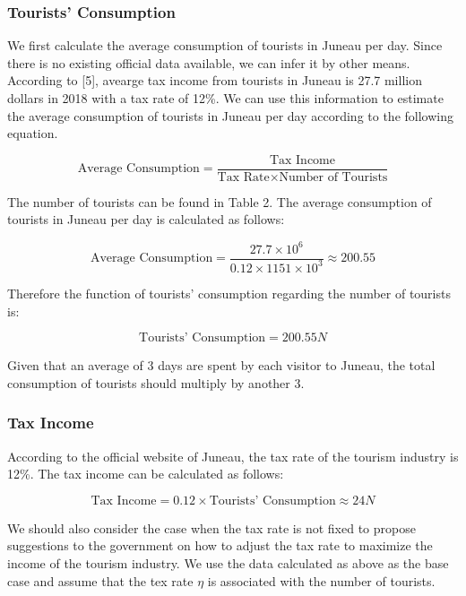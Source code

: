 \subsubsection{Tourists' Consumption}

We first calculate the average consumption of tourists in Juneau per day. Since there is no existing official data available, 
we can infer it by other means. According to [5], avearge tax income from tourists in Juneau is 27.7 million dollars in 2018
with a tax rate of 12\%. We can use this information to estimate the average consumption of tourists in Juneau per day according to 
the following equation.

\begin{equation}
    \text{Average Consumption} = \frac{\text{Tax Income}}{\text{Tax Rate} \times \text{Number of Tourists}}
\end{equation}

The number of tourists can be found in Table 2. The average consumption of 
tourists in Juneau per day is calculated as follows:

\begin{equation}
    \text{Average Consumption} = \frac{27.7 \times 10^6}{0.12 \times 1151 \times 10^3} \approx 200.55
\end{equation}

Therefore the function of tourists' consumption regarding the number of tourists is:


\begin{equation}
    \text{Tourists' Consumption} = 200.55 N
\end{equation}

Given that an average of 3 days are spent by each visitor to Juneau, 
the total consumption of tourists should multiply by another 3.

\subsubsection{Tax Income}

According to the official website of Juneau, the tax rate of the tourism industry is 12\%.
The tax income can be calculated as follows:

\begin{equation}
    \text{Tax Income} = 0.12 \times \text{Tourists' Consumption} \approx 24 N
\end{equation}

We should also consider the case when the tax rate is not fixed to propose suggestions to the
government on how to adjust the tax rate to maximize the income of the tourism industry. We
use the data calculated as above as the base case and assume that the tex rate $\eta$ is associated with the number of tourists.

